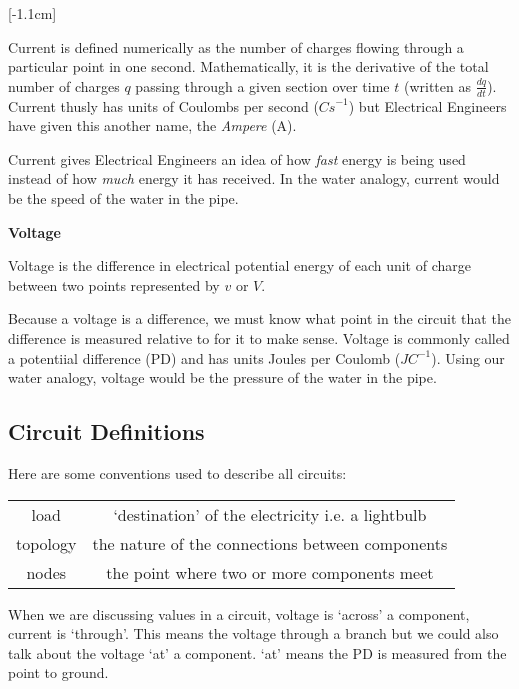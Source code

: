 \documentclass[12pt]{article}
\begin{document}
[-1.1cm]

Current is defined numerically as the number of charges flowing through a particular point in one second.
Mathematically, it is the derivative of the total number of charges $q$ passing through a given section over time $t$ (written as $\frac{dq}{dt}$).
Current thusly has units of Coulombs per second ($\unit{Cs}^{-1}$) but Electrical Engineers have given this another name, the \textit{Ampere} (A).

Current gives Electrical Engineers an idea of how \textit{fast} energy is being used instead of how \textit{much} energy it has received.
In the water analogy, current would be the speed of the water in the pipe. 


\textbf{Voltage}
\begin{definition*}
  Voltage is the difference in electrical potential energy of each unit of charge between two points represented by $v$ or $V$.
\end{definition*}

Because a voltage is a difference, we must know what point in the circuit that the difference is measured relative to for it to make sense.
Voltage is commonly called a potentiial difference (PD) and has units Joules per Coulomb ($\unit{JC}^{-1}$).
Using our water analogy, voltage would be the pressure of the water in the pipe.

\subsection{Circuit Definitions}
Here are some conventions used to describe all circuits:

\begin{tabular}{c|c}
load & `destination' of the electricity i.e. a lightbulb \\
topology & the nature of the connections between components \\
nodes & the point where two or more components meet \\
\end{tabular}

When we are discussing values in a circuit, voltage is `across' a component, current is `through'. 
This means the voltage through a branch but we could also talk about the voltage `at' a component.
`at' means the PD is measured from the point to ground.
\end{document}
